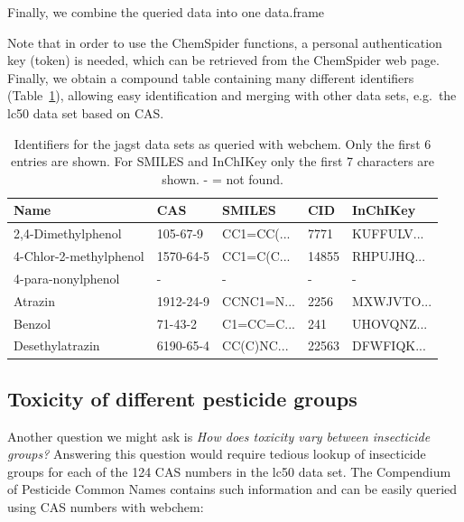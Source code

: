 Finally, we combine the queried data into one data.frame

\begin{knitrout}
\begin{kframe}
\begin{alltt}
 \hlkwb{<-} \hlstd{(}     
             \hlopt{$}  
             \hlstd{=} \hlstd{)}
\end{alltt}
\end{kframe}
\end{knitrout}

Note that in order to use the ChemSpider functions, a personal authentication key (token) is needed, which can be retrieved from the ChemSpider web page. 
Finally, we obtain a compound table containing many different identifiers (Table~\ref{tab:comptable}), allowing easy identification and merging with other data sets, e.g.\ the lc50 data set based on CAS.

  \begin{table}[ht]
  \centering
\begin{tabular}{lllll}
  \toprule
Name & CAS & SMILES & CID & InChIKey \\ 
  \midrule
2,4-Dimethylphenol & 105-67-9 & CC1=CC(... & 7771 & KUFFULV... \\ 
  4-Chlor-2-methylphenol & 1570-64-5 & CC1=C(C... & 14855 & RHPUJHQ... \\ 
  4-para-nonylphenol & - & - & - & - \\ 
  Atrazin & 1912-24-9 & CCNC1=N... & 2256 & MXWJVTO... \\ 
  Benzol & 71-43-2 & C1=CC=C... & 241 & UHOVQNZ... \\ 
  Desethylatrazin & 6190-65-4 & CC(C)NC... & 22563 & DFWFIQK... \\ 
   \bottomrule
\end{tabular}

\caption[Identifiers for the jagst data sets as queried with webchem.]{Identifiers for the jagst data sets as queried with webchem. Only the first 6 entries are shown. For SMILES and InChIKey only the first 7 characters are shown. - = not found.}
\label{tab:comptable}
\end{table}


\subsection[Toxicity of different pesticide groups]{Toxicity of different pesticide groups}
Another question we might ask is \emph{How does toxicity vary between insecticide groups?}
Answering this question would require tedious lookup of insecticide groups for each of the 124 CAS numbers in the lc50 data set.
The Compendium of Pesticide Common Names \citep{wood} contains such information and can be easily queried using CAS numbers with webchem: 


